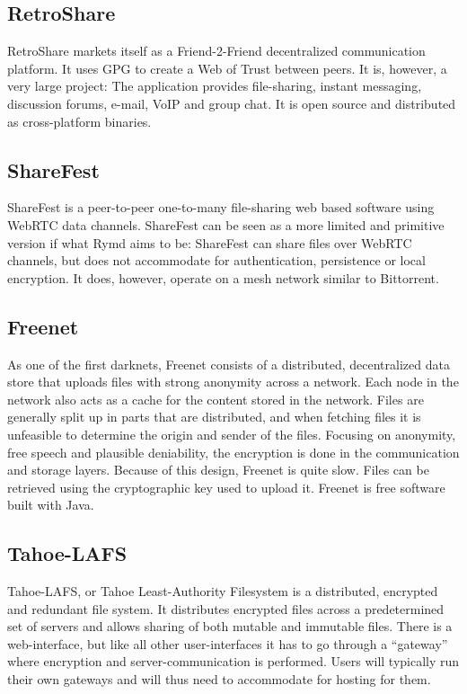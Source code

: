 \subsection{RetroShare}
RetroShare\cite{Retroshare:2014:Online} markets itself as a Friend-2-Friend decentralized communication platform. It uses GPG to create a Web of Trust between peers. It is, however, a very large project: The application provides file-sharing, instant messaging, discussion forums, e-mail, VoIP and group chat. It is open source and distributed as cross-platform binaries.
\subsection{ShareFest}
ShareFest\cite{Sharefest:2014:Online} is a peer-to-peer one-to-many file-sharing web based software using WebRTC data channels. ShareFest can be seen as a more limited and primitive version if what Rymd aims to be: ShareFest can share files over WebRTC channels, but does not accommodate for authentication, persistence or local encryption. It does, however, operate on a mesh network similar to Bittorrent.
\subsection{Freenet}
As one of the first darknets, Freenet\cite{Freenet:2014:Online} consists of a distributed, decentralized data store that uploads files with strong anonymity across a network. Each node in the network also acts as a cache for the content stored in the network. Files are generally split up in parts that are distributed, and when fetching files it is unfeasible to determine the origin and sender of the files. Focusing on anonymity, free speech and plausible deniability, the encryption is done in the communication and storage layers. Because of this design, Freenet is quite slow. Files can be retrieved using the cryptographic key used to upload it. Freenet is free software built with Java.
\subsection{Tahoe-LAFS}
Tahoe-LAFS\cite{Tahoe:2014:Online}, or Tahoe Least-Authority Filesystem is a distributed, encrypted and redundant file system. It distributes encrypted files across a predetermined set of servers and allows sharing of both mutable and immutable files. There is a web-interface, but like all other user-interfaces it has to go through a “gateway” where encryption and server-communication is performed. Users will typically run their own gateways and will thus need to accommodate for hosting for them.
